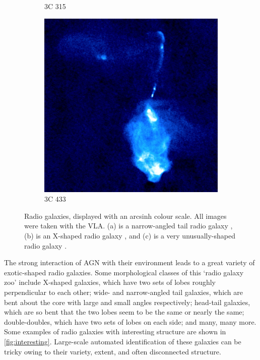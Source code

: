 \documentclass[11pt, a4paper]{book}
\begin{document}
\begin{figure}
\begin{subfigure}{0.3\textwidth}
                \caption{3C 315}
                \label{fig:3C315}
            \end{subfigure}
            \begin{subfigure}{0.3\textwidth}
                \includegraphics[width=\textwidth]{images/3C_433.jpg}
                \caption{3C 433}
                \label{fig:3C433}
            \end{subfigure}
            \caption[Three radio galaxies with interesting structure.]{Radio galaxies, displayed with an arcsinh colour scale. All images were taken with the VLA. (a) is a narrow-angled tail radio galaxy \citep{leahy_atlas_nodate}, (b) is an X-shaped radio galaxy \citep{leahy_polarization_1986}, and (c) is a very unusually-shaped radio galaxy \citep{black_study_1992}.}
            \label{fig:interesting}
        \end{figure}

        The strong interaction of AGN with their environment leads to a great variety of exotic-shaped radio galaxies. Some morphological classes of this `radio galaxy zoo' include X-shaped galaxies, which have two sets of lobes roughly perpendicular to each other; wide- and narrow-angled tail galaxies, which are bent about the core with large and small angles respectively; head-tail galaxies, which are so bent that the two lobes seem to be the same or nearly the same; double-doubles, which have two sets of lobes on each side; and many, many more. Some examples of radio galaxies with interesting structure are shown in \autoref{fig:interesting}. Large-scale automated identification of these galaxies can be tricky owing to their variety, extent, and often disconnected structure.
\end{document}
